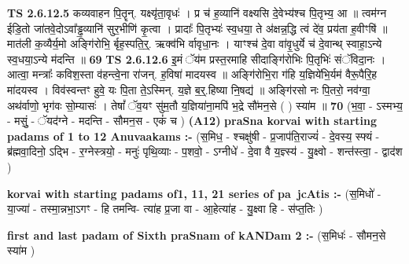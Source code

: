\documentclass[17pt]{extarticle}
\begin{document}
                  \newline
                                \textbf{ TS 2.6.12.5} \newline
                  कव्यवाहन पि॒तॄन्. यक्ष्यृ॑ता॒वृधः॑ । प्र च॑ ह॒व्यानि॑ वक्ष्यसि दे॒वेभ्य॑श्च पि॒तृभ्य॒ आ ॥ त्वम॑ग्न ईडि॒तो जा॑तवे॒दोऽवा᳚ड्ढ॒व्यानि॑ सुर॒भीणि॑ कृ॒त्वा । प्रादाः᳚ पि॒तृभ्यः॑ स्व॒धया॒ ते अ॑क्षन्न॒द्धि त्वं दे॑व॒ प्रय॑ता ह॒वीꣳषि॑ ॥ मात॑ली क॒व्यैर्य॒मो अङ्गि॑रोभि॒ र्बृह॒स्पति॒र्॒. ऋक्व॑भि र्वावृधा॒नः । याꣳश्च॑ दे॒वा वा॑वृ॒धुर्ये च॑ दे॒वान्थ् स्वाहा॒ऽन्ये स्व॒धया॒ऽन्ये म॑दन्ति ॥ \textbf{  69} \newline
                  \newline
                                \textbf{ TS 2.6.12.6} \newline
                  इ॒मं ॅय॑म प्रस्त॒रमाहि सीदाङ्गि॑रोभिः पि॒तृभिः॑ संॅविदा॒नः । आत्वा॒ मन्त्राः᳚ कविश॒स्ता व॑हन्त्वे॒ना रा॑जन्. ह॒विषा॑ मादयस्व ॥ अङ्गि॑रोभि॒रा ग॑हि य॒ज्ञिये॑भि॒र्यम॑ वैरू॒पैरि॒ह मा॑दयस्व । विव॑स्वन्तꣳ हुवे॒ यः पि॒ता ते॒ऽस्मिन्. य॒ज्ञे ब॒र्॒.हिष्या नि॒षद्य॑ ॥ अङ्गि॑रसो नः पि॒तरो॒ नव॑ग्वा॒ अथ॑र्वाणो॒ भृग॑वः सो॒म्यासः॑ । तेषां᳚ ॅव॒यꣳ सु॑म॒तौ य॒ज्ञिया॑ना॒मपि॑ भ॒द्रे सौ॑मन॒से ( ) स्या॑म ॥ \textbf{  70} \newline
                  \newline
                      (भ॒वा॒ - ऽस्मभ्य॒ - मसुं॒ - ॅयद॑ग्ने - मदन्ति - सौमन॒स - एकं॑ च )  \textbf{(A12)} \newline \newline
                \textbf{praSna korvai with starting padams of 1 to 12 Anuvaakams :-} \newline
        (स॒मिध॒ - श्चक्षु॑षी - प्र॒जाप॑ति॒राज्यं॑ - दे॒वस्य॒ स्फ्यं - ब्र॑ह्मवा॒दिनो॒ ऽद्भि - र॒ग्नेस्त्रयो॒ - मनुः॑ पृथि॒व्याः - प॒शवो॒ - ऽग्नीधे॑ - दे॒वा वै य॒ज्ञ्स्य॑ - यु॒क्ष्वो - शन्त॑स्त्वा॒ - द्वाद॑श ) \newline

        \textbf{korvai with starting padams of1, 11, 21 series of pa~jcAtis :-} \newline
        (स॒मिधो॑ - या॒ज्या॑ - तस्मा॒न्नभा॒ऽगꣳ - हि तमन्वि- त्या॑ह प्र॒जा वा - आ॒हेत्या॑ह - यु॒क्ष्वा हि - स॑प्त॒तिः ) \newline

        \textbf{first and last padam of Sixth praSnam of kANDam 2 :-} \newline
        (स॒मिधः॑ - सौमन॒से स्या॑म ) \newline 
\end{document}
